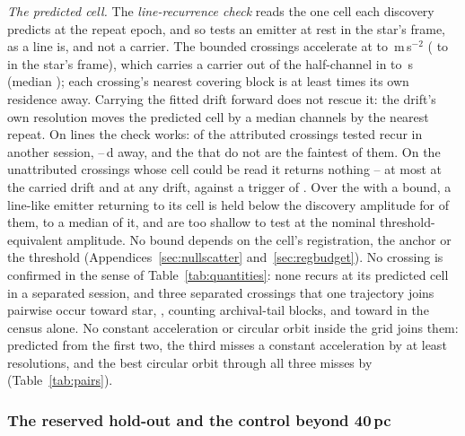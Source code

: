 \emph{The predicted cell.} The \emph{line-recurrence check} reads the one cell
each discovery predicts at the repeat epoch, and so tests an emitter at rest in
the star's frame, as a line is, and not a carrier. The \RcNExcl{} bounded crossings accelerate at \ZtALosLo{} to
\ZtALosHi\,m\,s$^{-2}$ (\EgExStarALosLo{} to \EgStarALosHi{} in the star's
frame), which carries a carrier out of the half-channel in
\ZtLeaveSecLo{} to \ZtLeaveSecHi\,s (median \ZtLeaveSecMed); each crossing's nearest covering block is at
least \ZtGapOverLeaveMin{} times its own residence away. Carrying the fitted
drift forward does not rescue it: the drift's own resolution moves the
predicted cell by a median \ZtRegChanMed{} channels by the nearest repeat. On
lines the check works: \MkAttrRecur{} of the \MkAttrTested{} attributed
crossings tested recur in another session, \QcSepMinD--\QcSepMaxD\,d away,
and the \MkAttrExcl{} that do not are the faintest of them.
On the \RcNExclPoss{} unattributed crossings
whose cell could be read it returns nothing -- at most \RcTMatched{} at the
carried drift and \RcTMax{} at any drift, against a trigger of
\StageNullTrig. Over the \RcNExcl{} with a bound, a line-like emitter returning
to its cell is held below the discovery amplitude for \RcNFracBelow{} of
them, to a median \RcFracMed{} of it, and \HjNPowerLo{} are too shallow to test
at the nominal threshold-equivalent amplitude. No bound
depends on the cell's registration, the anchor
or the threshold (Appendices~\ref{sec:nullscatter} and~\ref{sec:regbudget}).
\RcNoRepeatSentence No crossing is confirmed in the sense of
Table~\ref{tab:quantities}: none recurs at its predicted cell in a separated
session, and three separated crossings that one trajectory joins pairwise occur
toward \OpNTriAllWord{} star, \OpTriStars, counting archival-tail blocks, and
toward \OpNTriCenWord{} in the census alone. No constant acceleration or
circular orbit inside the grid joins them: predicted from the first two, the
third misses a constant acceleration by at least \TrAMissMin{} resolutions,
and the best circular orbit through all three misses by \TrJointMissMin{}
(Table~\ref{tab:pairs}).

\subsubsection{The reserved hold-out and the control beyond 40\,pc}
\label{sec:holdoutsearch}


